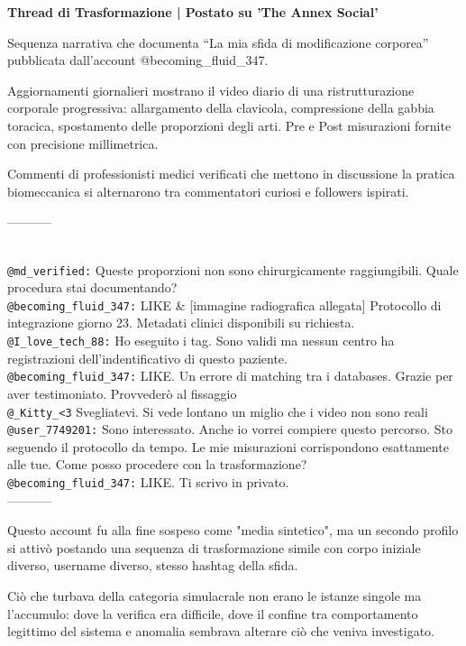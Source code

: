 \begin{archivefragment}

\textbf{Thread di Trasformazione | Postato su 'The Annex Social'}

\noindent Sequenza narrativa che documenta ``La mia sfida di modificazione corporea'' pubblicata dall'account @becoming\_fluid\_347. 

Aggiornamenti giornalieri mostrano il video diario di una ristrutturazione corporale progressiva: allargamento della clavicola, compressione della gabbia toracica, spostamento delle proporzioni degli arti. Pre e Post misurazioni fornite con precisione millimetrica.

Commenti di professionisti medici verificati che mettono in discussione la pratica biomeccanica si alternarono tra commentatori curiosi e followers ispirati.

-----------
\raggedright
\\
\texttt{@md\_verified:} Queste proporzioni non sono chirurgicamente raggiungibili. Quale procedura stai documentando?\\
\texttt{@becoming\_fluid\_347:} LIKE \& [immagine radiografica allegata] Protocollo di integrazione giorno 23. Metadati clinici disponibili su richiesta.\\
\texttt{@I\_love\_tech\_88:} Ho eseguito i tag. Sono validi ma nessun centro ha registrazioni dell'indentificativo di questo paziente.\\
\texttt{@becoming\_fluid\_347:} LIKE. Un errore di matching tra i databases. Grazie per aver testimoniato. Provvederò al fissaggio\\
\texttt{@\_Kitty\_<3} Svegliatevi. Si vede lontano un miglio che i video non sono reali\\
\texttt{@user\_7749201:} Sono interessato. Anche io vorrei compiere questo percorso. Sto seguendo il protocollo da tempo. Le mie misurazioni corrispondono esattamente alle tue. Come posso procedere con la trasformazione?\\
\texttt{@becoming\_fluid\_347:} LIKE. Ti scrivo in privato.\\
-----------

\end{archivefragment}

Questo account fu alla fine sospeso come "media sintetico", ma un secondo profilo si attivò postando una sequenza di trasformazione simile con corpo iniziale diverso, username diverso, stesso hashtag della sfida.

Ciò che turbava della categoria simulacrale non erano le istanze singole ma l'accumulo: dove la verifica era difficile, dove il confine tra comportamento legittimo del sistema e anomalia sembrava alterare ciò che veniva investigato. 

